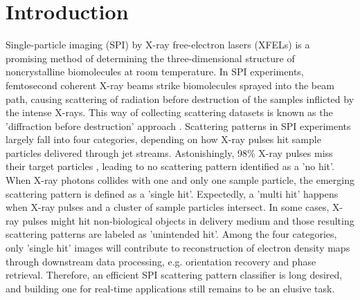 \section{Introduction}


Single-particle imaging (SPI) by X-ray free-electron lasers (XFELs) is a
promising method of determining the three-dimensional structure of
noncrystalline biomolecules at room temperature.   In SPI experiments,
femtosecond coherent X-ray beams strike biomolecules sprayed into the beam path,
causing scattering of radiation before destruction of the samples inflicted by
the intense X-rays.  This way of collecting scattering datasets is known as the
'diffraction before destruction' approach
\cite{neutzePotentialBiomolecularImaging2000,
chapmanFemtosecondDiffractiveImaging2006,seibertSingleMimivirusParticles2011,
aquilaLinacCoherentLight2015,reddyCoherentSoftXray2017a}.  Scattering patterns in
SPI experiments largely fall into four categories, depending on how X-ray pulses
hit sample particles delivered through jet streams.  Astonishingly, 98\% X-ray
pulses miss their target particles
\cite{shiEvaluationPerformanceClassification2019}, leading to no scattering
pattern identified as a 'no hit'.  When X-ray photons collides with one and only
one sample particle, the emerging scattering pattern is defined as a 'single
hit'. Expectedly, a 'multi hit' happens when X-ray pulses and a cluster of
sample particles intersect. In some cases, X-ray pulses might hit non-biological
objects in delivery medium and those resulting scattering patterns are labeled
as 'unintended hit'.  Among the four categories, only 'single hit' images will
contribute to reconstruction of electron density maps through downstream data
processing, e.g. orientation recovery and phase retrieval.  Therefore, an
efficient SPI scattering pattern classifier is long desired, and building one
for real-time applications still remains to be an elusive task.


% 

